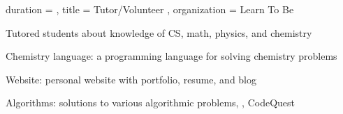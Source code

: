 \documentclass[sidebar-width=2.25in, primary=slate]{clean-resume}
\begin{document}
\begin{main}
\begin{experience}
    \end{experience}
    
    
    \begin{experience}
      {
        duration = {  },
        title = { Tutor/Volunteer },
        organization = { Learn To Be }
      }
      \item Tutored students about knowledge of CS, math, physics, and   ch\-em\-istry
    \end{experience}
    
    
    
    
    \begin{lst}
      \item Chemistry language: a programming language for solving chemistry   problems
      \item Website: personal website with portfolio, resume, and blog
      \item Algorithms: solutions to various algorithmic problems, \eg, CodeQuest
    \end{lst}
    

\end{main}
\end{document}
